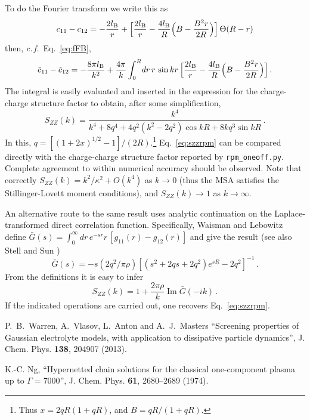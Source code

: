 \documentclass[12pt,a4paper]{article}
\DeclareMathOperator{\imaginary}{Im}
\newcommand{\latin}[1]{\emph{#1}}
\newcommand{\cf}{\latin{c.\,f.}}
\newcommand{\Eqref}[1]{Eq.~\eqref{#1}}
\begin{document}
To do the Fourier transform we write this as
%
\begin{equation}
  c_{11}-c_{12}=-\frac{2l_{\mathrm{B}}}{r}+\Bigl[\frac{2l_{\mathrm{B}}}{r}
  -\frac{4l_{\mathrm{B}}}{R}\Bigl(B-\frac{B^2 r}{2R}\Bigr)\Bigr]\,\Theta(R-r)
\end{equation}
%
then, \cf\ \Eqref{eq:fFB},
%
\begin{equation}
  \tilde c_{11}-\tilde c_{12}=-\frac{8\pi l_{\mathrm{B}}}{k^2}+
  \frac{4\pi}{k}\int_0^R\!dr\,r\,\sin kr\,\Bigl[\frac{2l_{\mathrm{B}}}{r}
  -\frac{4l_{\mathrm{B}}}{R}\Bigl(B-\frac{B^2 r}{2R}\Bigr)\Bigr]\,.
\end{equation}
%
The integral is easily evaluated and inserted in the expression
for the charge-charge structure factor to obtain, after some
simplification,
%
\begin{equation}
  S_{ZZ}(k)=\frac{k^4}{k^4+8q^4+4q^2(k^2-2q^2)\cos kR+8kq^3\sin kR}\,.
  \label{eq:szzrpm}
\end{equation}
%
In this, $q=[(1+2x)^{1/2}-1]/(2R)$.\footnote{Thus $x=2qR(1+qR)$, and
  $B=qR/(1+qR)$.}  \Eqref{eq:szzrpm} can be compared directly with the
charge-charge structure factor reported by \verb+rpm_oneoff.py+.
Complete agreement to within numerical accuracy should be observed.
Note that correctly $S_{ZZ}(k)=k^2/\kappa^2+O(k^4)$ as $k\to0$ (thus
the MSA satisfies the Stillinger-Lovett moment conditions), and
$S_{ZZ}(k)\to1$ as $k\to\infty$.

An alternative route to the same result uses analytic continuation on
the Laplace-transformed direct correlation function.  Specifically,
Waisman and Lebowitz \cite{WL72} define $\bar G(s)=\int_0^\infty
dr\,e^{-sr} r\, [g_{11}(r)-g_{12}(r)]$ and give the result (see also
Stell and Sun \cite{SS75})
%
\begin{equation}
  \bar G(s)=-s(2q^2/\pi\rho)[(s^2+2qs+2q^2)e^{sR}-2q^2]^{-1}\,.
\end{equation}
%
From the definitions it is easy to infer
%
\begin{equation}
  S_{ZZ}(k)=1+\frac{2\pi\rho}{k}\imaginary \bar G(-ik)\,.
\end{equation}
%
If the indicated operations are carried out, one recovers
\Eqref{eq:szzrpm}.

\thebibliography{}

 P.~B.~Warren, A.~Vlasov, L.~Anton and A.~J.~Masters
  ``Screening properties of Gaussian electrolyte models, with
  application to dissipative particle dynamics'',
  J. Chem. Phys. {\bf138}, 204907 (2013).

 K.-C. Ng, ``Hypernetted chain solutions for the
  classical one-component plasma up to $\Gamma=7000$'',
  J. Chem. Phys. {\bf61}, 2680--2689 (1974).
\end{document}
